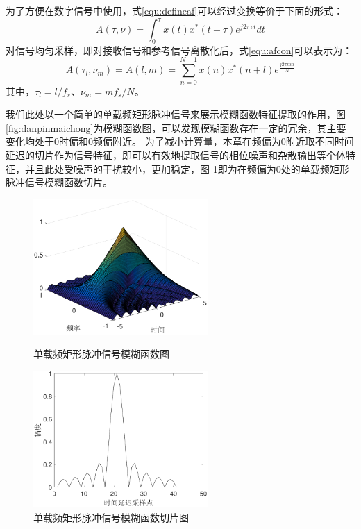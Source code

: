 为了方便在数字信号中使用，式\ref{equ:defineaf}可以经过变换等价于下面的形式：
\begin{equation}
A(\tau,\nu) = \int_{0}^{\tau}x(t)x^{*}(t+\tau)e^{j2\pi\nu t}dt
\label{equ:afcon}
\end{equation}
对信号均匀采样，即对接收信号和参考信号离散化后，式\ref{equ:afcon}可以表示为：
\begin{equation}
A(\tau_l,\nu_m) = A(l, m) = \sum_{n = 0}^{N-1}x(n)x^{*}(n+l)e^{\frac{j2\pi m n}{N}}
\end{equation}
其中，$\tau_l=l/f_s$、$\nu_m=mf_s/N$。

我们此处以一个简单的单载频矩形脉冲信号来展示模糊函数特征提取的作用，图\ref{fig:danpinmaichong}为模糊函数图，可以发现模糊函数存在一定的冗余，其主要变化均处于0时偏和0频偏附近。
为了减小计算量，本章在频偏为0附近取不同时间延迟的切片作为信号特征，即可以有效地提取信号的相位噪声和杂散输出等个体特征，并且此处受噪声的干扰较小，更加稳定，图 \ref{fig:qiepian}即为在频偏为0处的单载频矩形脉冲信号模糊函数切片。

\begin{figure}[H]
	\centering
	\begin{minipage}{7cm}
		\centering
		\includegraphics[width=6.67cm]{figures/emitter/danpinmaichong}
		\caption{单载频矩形脉冲信号模糊函数图}
		\label{fig:danpinmaichong}
	\end{minipage}
	\hspace{10pt}
	\begin{minipage}{7cm}
		\centering
		\includegraphics[width=6.67cm]{figures/emitter/qiepian}
		\caption{单载频矩形脉冲信号模糊函数切片图}
		\label{fig:qiepian}
	\end{minipage}

\end{figure}


